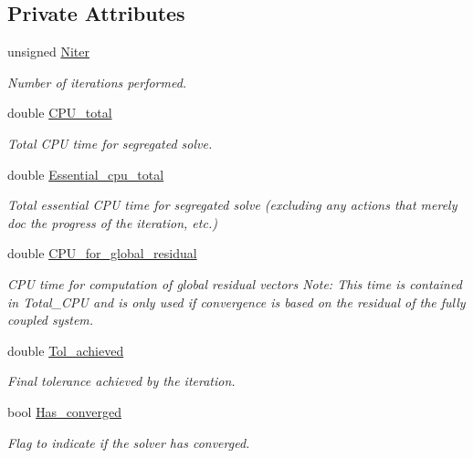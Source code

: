 \subsection*{Private Attributes}
\begin{DoxyCompactItemize}
\item 
unsigned \hyperlink{classoomph_1_1PicardConvergenceData_ac288000c0ccc529a43cf98dd9a6ef85c}{Niter}
\begin{DoxyCompactList}\small\item\em Number of iterations performed. \end{DoxyCompactList}\item 
double \hyperlink{classoomph_1_1PicardConvergenceData_ae2fe34d1dc2f889d89fd75a8f0805e21}{C\+P\+U\+\_\+total}
\begin{DoxyCompactList}\small\item\em Total C\+PU time for segregated solve. \end{DoxyCompactList}\item 
double \hyperlink{classoomph_1_1PicardConvergenceData_aa79f69879023de7cd55d7343a504b3b6}{Essential\+\_\+cpu\+\_\+total}
\begin{DoxyCompactList}\small\item\em Total essential C\+PU time for segregated solve (excluding any actions that merely doc the progress of the iteration, etc.) \end{DoxyCompactList}\item 
double \hyperlink{classoomph_1_1PicardConvergenceData_ae67b27988776ac7e138b8a1513e2da5e}{C\+P\+U\+\_\+for\+\_\+global\+\_\+residual}
\begin{DoxyCompactList}\small\item\em C\+PU time for computation of global residual vectors Note\+: This time is contained in Total\+\_\+\+C\+PU and is only used if convergence is based on the residual of the fully coupled system. \end{DoxyCompactList}\item 
double \hyperlink{classoomph_1_1PicardConvergenceData_af2fad7cea38c640c90f1784491695684}{Tol\+\_\+achieved}
\begin{DoxyCompactList}\small\item\em Final tolerance achieved by the iteration. \end{DoxyCompactList}\item 
bool \hyperlink{classoomph_1_1PicardConvergenceData_a9f8602cce0f1e001f94f125e9278cc78}{Has\+\_\+converged}
\begin{DoxyCompactList}\small\item\em Flag to indicate if the solver has converged. \end{DoxyCompactList}\end{DoxyCompactItemize}


